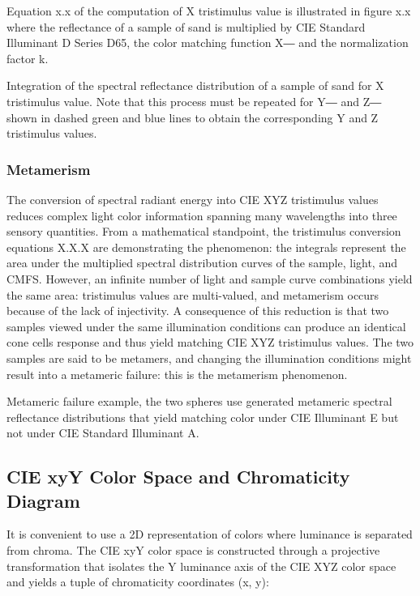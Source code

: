 Equation x.x of the computation of X tristimulus value is illustrated in figure x.x where the reflectance of a sample of sand is multiplied by CIE Standard Illuminant D Series D65, the color matching function X― and the normalization factor k.

Integration of the spectral reflectance distribution of a sample of sand for X tristimulus value. Note that this process must be repeated for Y― and Z― shown in dashed green and blue lines to obtain the corresponding Y and Z tristimulus values.

\subsubsection{Metamerism}%
\label{subsubsec:metamerism}

The conversion of spectral radiant energy into CIE XYZ tristimulus values reduces complex light color information spanning many wavelengths into three sensory quantities. From a mathematical standpoint, the tristimulus conversion equations X.X.X are demonstrating the phenomenon: the integrals represent the area under the multiplied spectral distribution curves of the sample, light, and CMFS. However, an infinite number of light and sample curve combinations yield the same area: tristimulus values are multi-valued, and metamerism occurs because of the lack of injectivity. A consequence of this reduction is that two samples viewed under the same illumination conditions can produce an identical cone cells response and thus yield matching CIE XYZ tristimulus values. The two samples are said to be metamers, and changing the illumination conditions might result into a metameric failure: this is the metamerism phenomenon.


Metameric failure example, the two spheres use generated metameric spectral reflectance distributions that yield matching color under CIE Illuminant E but not under CIE Standard Illuminant A.

\subsection{CIE xyY Color Space and Chromaticity Diagram}%
\label{subsec:cie-xyy-color-space-and-chromaticity-diagram}

It is convenient to use a 2D representation of colors where luminance is separated from chroma. The CIE xyY color space is constructed through a projective transformation that isolates the Y luminance axis of the CIE XYZ color space and yields a tuple of chromaticity coordinates (x, y):

